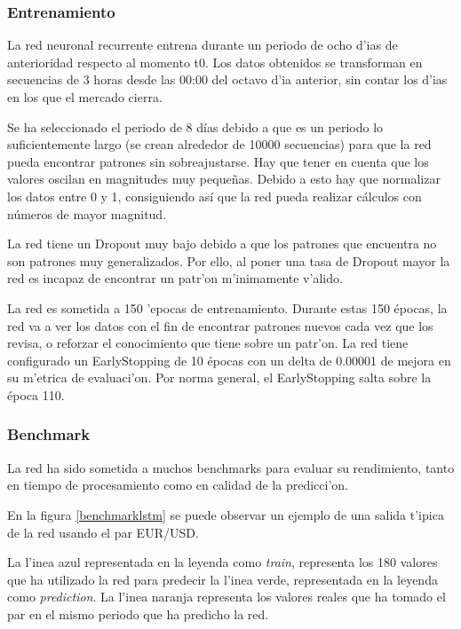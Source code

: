 \subsubsection*{Entrenamiento}

La red neuronal recurrente entrena durante un periodo de ocho d'ias de anterioridad respecto al momento t0.
Los datos obtenidos se transforman en secuencias de 3 horas desde las 00:00 del octavo d'ia anterior, sin contar los d'ias en los que el mercado cierra. 

Se ha seleccionado el periodo de 8 días debido a que es un periodo lo suficientemente largo (se crean alrededor de 10000 secuencias) para que la red pueda encontrar patrones sin sobreajustarse. Hay que tener en cuenta que los valores oscilan en magnitudes muy pequeñas. Debido a esto hay que normalizar los datos entre 0 y 1, consiguiendo así que la red pueda realizar cálculos con números de mayor magnitud.  

La red tiene un Dropout muy bajo debido a que los patrones que encuentra no son patrones muy generalizados. Por ello, al poner una tasa de Dropout mayor la red es incapaz de encontrar un patr'on m'inimamente v'alido. 

La red es sometida a 150 'epocas de entrenamiento. Durante estas 150 épocas, la red va a ver los datos con el fin de encontrar patrones nuevos cada vez que los revisa, o reforzar el conocimiento que tiene sobre un patr'on. 
La red tiene configurado un EarlyStopping de 10 épocas con un delta de 0.00001 de mejora en su m'etrica de evaluaci'on. Por norma general, el EarlyStopping salta sobre la época 110. 


\subsubsection*{Benchmark}

La red ha sido sometida a muchos benchmarks para evaluar su rendimiento, tanto en tiempo de procesamiento como en calidad de la predicci'on. 

En la figura \ref{benchmarklstm} se puede observar un ejemplo de una salida t'ipica de la red usando el par EUR/USD. 


La l'inea azul representada en la leyenda como \textit{train}, representa los 180 valores que ha utilizado la red para predecir la l'inea verde, representada en la leyenda como \textit{prediction}. La l'inea naranja representa los valores reales que ha tomado el par en el mismo periodo que ha predicho la red. 

